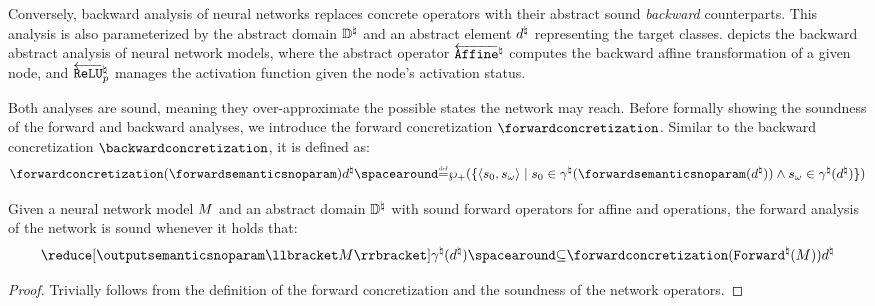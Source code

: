Conversely, backward analysis of neural networks replaces concrete operators with their abstract sound \emph{backward} counterparts. This analysis is also parameterized by the abstract domain $\mathbb{D}^\natural$ and an abstract element $d^\natural$ representing the target classes.
 depicts the backward abstract analysis of neural network models, where the abstract operator $\overleftarrow{\textup{\texttt{Affine}}}^\natural$ computes the backward affine transformation of a given node, and $\overleftarrow{\textup{\texttt{ReLU}}}^\natural_p$ manages the \relu{} activation function given the node's activation status.

Both analyses are sound, meaning they over-approximate the possible states the network may reach.
Before formally showing the soundness of the forward and backward analyses, we introduce the forward concretization $\forwardconcretization$.
Similar to the backward concretization $\backwardconcretization$, it is defined as:
\[
  \forwardconcretization(\forwardsemanticsnoparam)\defabstractvalue \DefeQ
  \nonemptysetof{\setdef{
    \inputoutputtuple{\defstate}
  }{
    \retrieveinput{\defstate}\in\abstractdomainconcretization(\forwardsemanticsnoparam(\defabstractvalue))\land\retrieveoutput{\defstate}\in\abstractdomainconcretization(\defabstractvalue)
    }
  }
  \]

\begin{lemma}
  Given a neural network model $M$ and an abstract domain $\mathbb{D}^\natural$ with sound forward operators for affine and \relu{} operations, the forward analysis of the network is sound whenever it holds that:
  \[
    \reduce[\outputsemanticsnoparam\semanticsof{\defmodel}]{\abstractdomainconcretization(\defabstractvalue)} \SubseteQ \forwardconcretization(\abstractdomainforward(\defmodel))\defabstractvalue
  \]
\end{lemma}
\begin{proof}
  Trivially follows from the definition of the forward concretization and the soundness of the network operators.
\end{proof}


